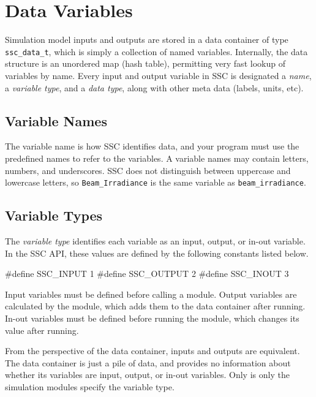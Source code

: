 \documentclass{article}
\begin{document}
\section{Data Variables}
\label{sec_variables}

Simulation model inputs and outputs are stored in a data container of type \texttt{ssc\_data\_t}, which is simply a collection of named variables.  Internally, the data structure is an unordered map (hash table), permitting very fast lookup of variables by name.  Every input and output variable in SSC is designated a \emph{name}, a \emph{variable type}, and a \emph{data type}, along with other meta data (labels, units, etc). 

\subsection{Variable Names}

The variable name is how SSC identifies data, and your program must use the predefined names to refer to the variables. A variable names may contain letters, numbers, and underscores. SSC does not distinguish between uppercase and lowercase letters, so \texttt{Beam\_Irradiance} is the same variable as \texttt{beam\_irradiance}.

\subsection{Variable Types}

The \emph{variable type} identifies each variable as an input, output, or in-out variable.  In the SSC API, these values are defined by the following constants listed below.

\begin{verbatimtab}
#define SSC_INPUT 1
#define SSC_OUTPUT 2
#define SSC_INOUT 3
\end{verbatimtab}

Input variables must be defined before calling a module. Output variables are calculated by the module, which adds them to the data container after running. In-out variables must be defined before running the module, which changes its value after running.

From the perspective of the data container, inputs and outputs are equivalent. The data container is just a pile of data, and provides no information about whether its variables are input, output, or in-out variables. Only is only the simulation modules specify the variable type.
\end{document}
